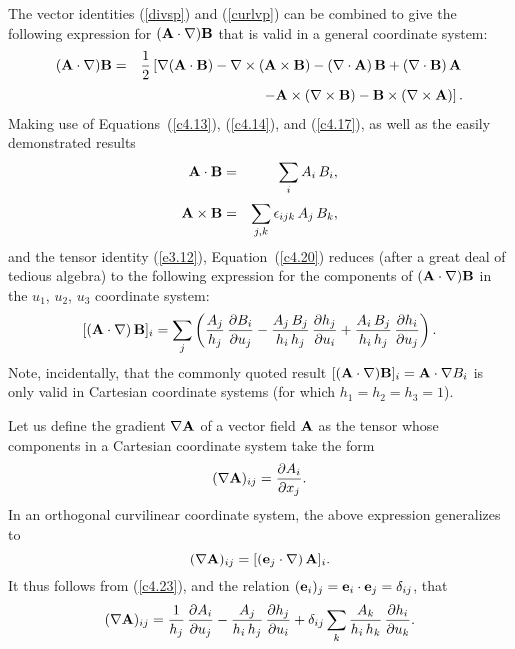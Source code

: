The vector identities (\ref{divsp}) and (\ref{curlvp}) can be combined to give the
following expression for $({\bf A}\cdot\nabla){\bf B}$ that is valid in a general coordinate system:
\begin{eqnarray}\label{c4.20}
({\bf A}\cdot\nabla) {\bf B} &=& \frac{1}{2}\left[\nabla({\bf A}\cdot{\bf B}) - \nabla\times ({\bf A}\times {\bf B})
- (\nabla\cdot{\bf A})\,{\bf B} + (\nabla\cdot{\bf B})\,{\bf A} \right.\nonumber\\[0.5ex]
&&\left.
- {\bf A}\times(\nabla\times {\bf B})-{\bf B}\times (\nabla\times {\bf A})\right].
\end{eqnarray}
Making use of Equations~(\ref{c4.13}), (\ref{c4.14}), and (\ref{c4.17}), as well
as the easily demonstrated results
\begin{eqnarray}\label{c4.21}
{\bf A}\cdot{\bf B} &=&\sum_i A_i\,B_i,\\[0.5ex]
{\bf A}\times {\bf B} &=&\sum_{j,k} \epsilon_{ijk}\,A_j\,B_k,\label{c4.22}
\end{eqnarray}
and the tensor identity (\ref{e3.12}),  Equation~(\ref{c4.20}) reduces (after a great deal of tedious algebra) to the
following expression for the components of $({\bf A}\cdot\nabla){\bf B}$ in  the $u_1$, $u_2$, $u_3$
coordinate system:
\begin{equation}\label{c4.23}
[({\bf A}\cdot\nabla)\,{\bf B}]_i= \sum_j\left(\frac{A_j}{h_j}\,\frac{\partial B_i}{\partial u_j}- \frac{A_j\,B_j}{h_i\,h_j}\,\frac{\partial h_j}{\partial u_i} + \frac{A_i\,B_j}{h_i\,h_j}\,\frac{\partial h_i}{\partial u_j}\right).
\end{equation}
Note, incidentally, that the commonly quoted result $[({\bf A}\cdot\nabla){\bf B}]_i={\bf A}\cdot\nabla B_i$ is only valid in  Cartesian coordinate systems (for which $h_1=h_2=h_3=1$). 

Let us define the gradient $\nabla{\bf A}$ of a vector field ${\bf A}$ as the tensor whose components in a Cartesian coordinate
system take the form
\begin{equation}
(\nabla {\bf A})_{ij} = \frac{\partial A_i}{\partial x_j}.
\end{equation}
In an orthogonal curvilinear coordinate system, the above
expression generalizes to 
\begin{equation}
(\nabla{\bf A})_{ij} = [({\bf e}_j\cdot\nabla)\,{\bf A}]_i.
\end{equation}
It thus follows from (\ref{c4.23}), and the relation $({\bf e}_i)_j = {\bf e}_i\cdot {\bf e}_j=\delta_{ij}$, that
\begin{equation}\label{c4.26}
(\nabla{\bf A})_{ij} = \frac{1}{h_j}\,\frac{\partial A_i}{\partial u_j} - \frac{A_j}{h_i\,h_j}\,\frac{\partial h_j}{\partial u_i}
+\delta_{ij}\sum_k\frac{A_k}{h_i\,h_k}\,\frac{\partial h_i}{\partial u_k}.
\end{equation}

